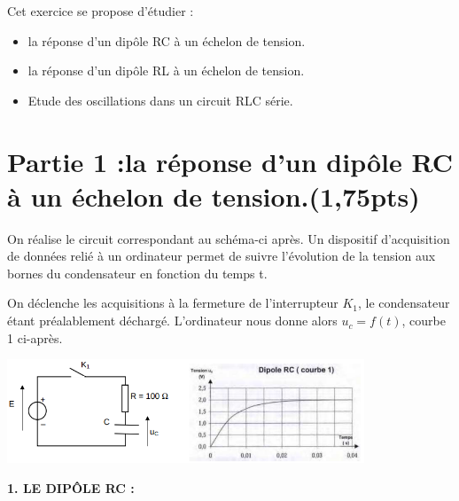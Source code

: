 \documentclass[12pt]{article}
\begin{document}
Cet exercice se propose d’étudier :
\begin{itemize}
	\item la réponse d’un dipôle RC à un échelon de tension.
	\item la réponse d’un dipôle RL à un échelon de tension.
	\item Etude des oscillations dans un circuit RLC série.
\end{itemize}

\vspace{-1cm}
\section*{Partie 1 :la réponse d’un dipôle RC à un échelon de tension.\dotfill(1,75pts)}

On réalise le circuit correspondant au schéma-ci après. Un dispositif d’acquisition de
données relié à un ordinateur permet de suivre l’évolution de la tension aux bornes du
condensateur en fonction du temps t.

On déclenche les acquisitions à la fermeture de l’interrupteur $K_1$, le condensateur étant
préalablement déchargé. L’ordinateur nous donne alors $u_c = f(t)$, courbe 1 ci-après.

\begin{center}

	\includegraphics[width=0.8\textwidth]{./img/RC.png}
\end{center}

\textbf{1. LE DIPÔLE RC :}
\end{document}
